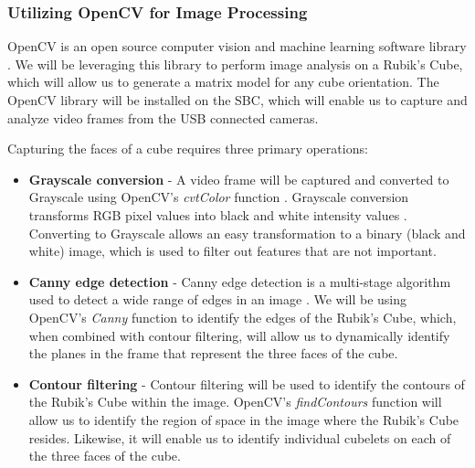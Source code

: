 \documentclass[final, letterpaper, 10 pt, conference, onecolumn]{IEEEtran}
\begin{document}
\subsubsection{Utilizing OpenCV for Image Processing}
\label{sec:image processing}
OpenCV is an open source computer vision and machine learning software library \cite{OpenCV}. We will be leveraging this library to perform image analysis on a Rubik's Cube, which will allow us to generate a matrix model for any cube orientation. The OpenCV library will be installed on the SBC, which will enable us to capture and analyze video frames from the USB connected cameras.

Capturing the faces of a cube requires three primary operations:

\begin{itemize}
  \item \textbf{Grayscale conversion} -
 A video frame will be captured and converted to Grayscale using OpenCV's \textit{cvtColor} function \cite{cvtColor}. Grayscale conversion transforms RGB pixel values into black and white intensity values \cite{Grayscale}. Converting to Grayscale allows an easy transformation to a binary (black and white) image, which is used to filter out features that are not important.
  \item  \textbf{Canny edge detection} -
 Canny edge detection is a multi-stage algorithm used to detect a wide range of edges in an image \cite{Canny Edge Detection, Moeslund Edge Detection}. We will be using OpenCV's \textit{Canny} function \cite{OpenCV Canny} to identify the edges of the Rubik's Cube, which, when combined with contour filtering, will allow us to dynamically identify the planes in the frame that represent the three faces of the cube.

  \item \textbf{Contour filtering} -
 Contour filtering will be used to identify the contours of the Rubik's Cube within the image. OpenCV's \textit{findContours} function \cite{findContours, Suzuki85} will allow us to identify the region of space in the image where the Rubik's Cube resides. Likewise, it will enable us to identify individual cubelets on each of the three faces of the cube.
\end{itemize}
\end{document}

